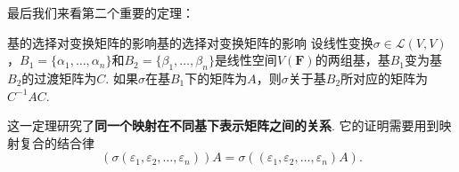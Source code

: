 





最后我们来看第二个重要的定理：
\begin{theorem}{基的选择对变换矩阵的影响}{基的选择对变换矩阵的影响}
    设线性变换$\sigma \in \mathcal{L}(V,V)$，$B_1=\{\alpha_1,\ldots,\alpha_n\}$和$B_2=\{\beta_1,\ldots,\beta_n\}$是线性空间$V(\mathbf{F})$的两组基，基$B_1$变为基$B_2$的过渡矩阵为$C$. 如果$\sigma$在基$B_1$下的矩阵为$A$，则$\sigma$关于基$B_2$所对应的矩阵为$C^{-1}AC$.
\end{theorem}
这一定理研究了\textbf{同一个映射在不同基下表示矩阵之间的关系}. 它的证明需要用到映射复合的结合律
\[(\sigma(\varepsilon_1,\varepsilon_2,\ldots,\varepsilon_n))A=\sigma((\varepsilon_1,\varepsilon_2,\ldots,\varepsilon_n)A).\]

